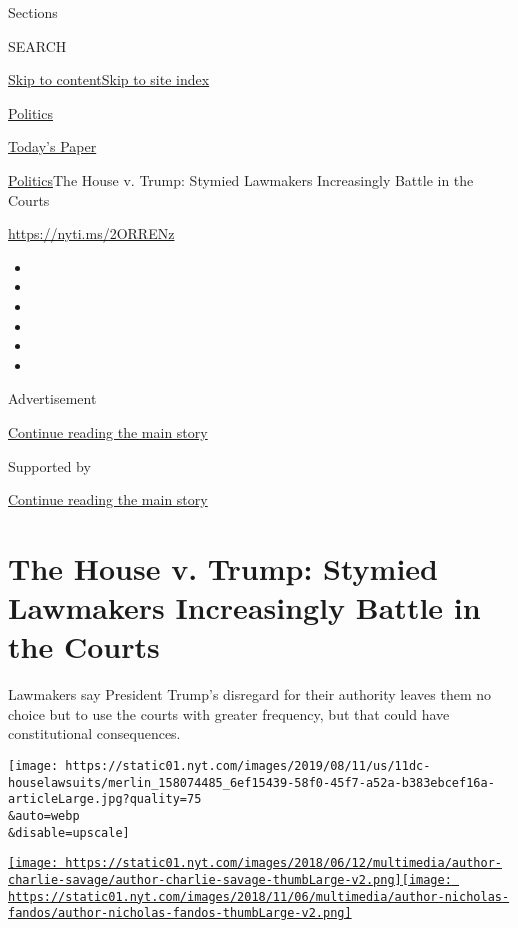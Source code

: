 Sections

SEARCH

\protect\hyperlink{site-content}{Skip to
content}\protect\hyperlink{site-index}{Skip to site index}

\href{https://www.nytimes.com/section/politics}{Politics}

\href{https://myaccount.nytimes.com/auth/login?response_type=cookie\&client_id=vi}{}

\href{https://www.nytimes.com/section/todayspaper}{Today's Paper}

\href{/section/politics}{Politics}\textbar{}The House v. Trump: Stymied
Lawmakers Increasingly Battle in the Courts

\url{https://nyti.ms/2ORRENz}

\begin{itemize}
\item
\item
\item
\item
\item
\item
\end{itemize}

Advertisement

\protect\hyperlink{after-top}{Continue reading the main story}

Supported by

\protect\hyperlink{after-sponsor}{Continue reading the main story}

\hypertarget{the-house-v-trump-stymied-lawmakers-increasingly-battle-in-the-courts}{%
\section{The House v. Trump: Stymied Lawmakers Increasingly Battle in
the
Courts}\label{the-house-v-trump-stymied-lawmakers-increasingly-battle-in-the-courts}}

Lawmakers say President Trump's disregard for their authority leaves
them no choice but to use the courts with greater frequency, but that
could have constitutional consequences.

\texttt{[image: https://static01.nyt.com/images/2019/08/11/us/11dc-houselawsuits/merlin\_158074485\_6ef15439-58f0-45f7-a52a-b383ebcef16a-articleLarge.jpg?quality=75\\\&auto=webp\\\&disable=upscale]}

\href{https://www.nytimes.com/by/charlie-savage}{\texttt{[image: https://static01.nyt.com/images/2018/06/12/multimedia/author-charlie-savage/author-charlie-savage-thumbLarge-v2.png]}}\href{https://www.nytimes.com/by/nicholas-fandos}{\texttt{[image: https://static01.nyt.com/images/2018/11/06/multimedia/author-nicholas-fandos/author-nicholas-fandos-thumbLarge-v2.png]}}

